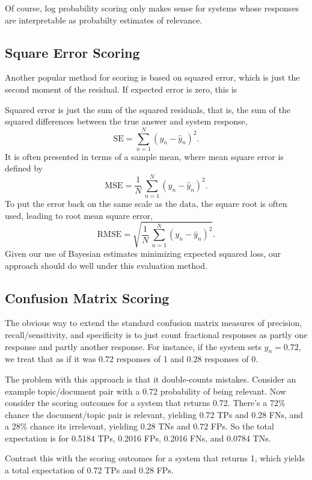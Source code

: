 \documentclass{article}
\begin{document}
Of course, log probability scoring only makes sense for
systems whose responses are interpretable as probabilty estimates of
relevance.

\subsection{Square Error Scoring}

Another popular method for scoring is based on squared error, which is
just the second moment of the residual.  If expected error is zero,
this
is 

Squared
error is just the sum of the squared residuals, that is, the sum
of the squared differences between the true answer and system response,
%
\[
\mbox{SE} = \sum_{n=1}^N (y_n - \hat{y}_n)^2.
\]
%
It is often presented in terms of a sample mean, where mean square
error is defined by
\[
\mbox{MSE} = \frac{1}{N} \, \sum_{n=1}^N (y_n - \hat{y}_n)^2.
\]
%
To put the error back on the same scale as the data, the square root
is often used, leading to root mean square error,
\[
\mbox{RMSE} = \sqrt{\frac{1}{N} \, \sum_{n=1}^N (y_n - \hat{y}_n)^2}.
\]
%
Given our use of Bayesian estimates minimizing expected squared loss,
our approach should do well under this evaluation method.


\subsection{Confusion Matrix Scoring}\label{confusion-matrix-eval-sec}

The obvious way to extend the standard confusion matrix measures
of precision, recall/sensitivity, and specificity is to just count
fractional responses as partly one response and partly another
response.  For instance, if the system sets $\hat{y}_n = 0.72$,
we treat that as if it was 0.72 responses of 1 and 0.28 responses
of 0. 

The problem with this approach is that it double-counts mistakes.
Consider an example topic/document pair with a 0.72 probability of
being relevant.  Now consider the scoring outcomes for a system that
returns 0.72.  There's a 72\% chance the document/topic pair is
relevant, yielding 0.72 TPs and 0.28 FNs, and a 28\% chance its
irrelevant, yielding 0.28 TNs and 0.72 FPs.  So the total
expectation is for 0.5184 TPs, 0.2016 FPs, 0.2016 FNs, and 
0.0784 TNs.  

Contrast this with the scoring outcomes for a system that returns 1,
which yields a total expectation of 0.72 TPs and 0.28 FPs.
\end{document}
